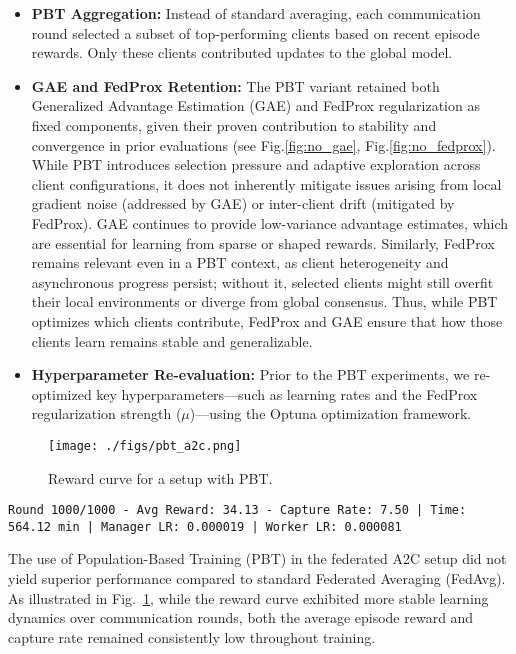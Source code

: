 \documentclass[12pt,a4paper,twoside,openany]{book}
\begin{document}
\begin{itemize}
\item \textbf{PBT Aggregation:} Instead of standard averaging, each communication round selected a subset of top-performing clients based on recent episode rewards. Only these clients contributed updates to the global model.
\item \textbf{GAE and FedProx Retention:} The PBT variant retained both Generalized Advantage Estimation (GAE) and FedProx regularization as fixed components, given their proven contribution to stability and convergence in prior evaluations (see Fig.\ref{fig:no_gae}, Fig.\ref{fig:no_fedprox}).
While PBT introduces selection pressure and adaptive exploration across client configurations, it does not inherently mitigate issues arising from local gradient noise (addressed by GAE) or inter-client drift (mitigated by FedProx).
GAE continues to provide low-variance advantage estimates, which are essential for learning from sparse or shaped rewards. Similarly, FedProx remains relevant even in a PBT context, as client heterogeneity and asynchronous progress persist; without it, selected clients might still overfit their local environments or diverge from global consensus. Thus, while PBT optimizes which clients contribute, FedProx and GAE ensure that how those clients learn remains stable and generalizable.
\item \textbf{Hyperparameter Re-evaluation:} Prior to the PBT experiments, we re-optimized key hyperparameters—such as learning rates and the FedProx regularization strength ($\mu$)—using the Optuna optimization framework. 
\end{itemize}

\begin{figure}[H]
\centering
\texttt{[image: ./figs/pbt\_a2c.png]}
\captionsetup{font=small}
\caption{Reward curve for a setup with PBT.}
\label{fig:pbt_a2c}
\end{figure}

\begin{lstlisting}
Round 1000/1000 - Avg Reward: 34.13 - Capture Rate: 7.50 | Time: 564.12 min | Manager LR: 0.000019 | Worker LR: 0.000081
\end{lstlisting}


The use of Population-Based Training (PBT) in the federated A2C setup did not yield superior performance compared to standard Federated Averaging (FedAvg). As illustrated in Fig.~\ref{fig:pbt_a2c}, while the reward curve exhibited more stable learning dynamics over communication rounds, both the average episode reward and capture rate remained consistently low throughout training.
\end{document}
